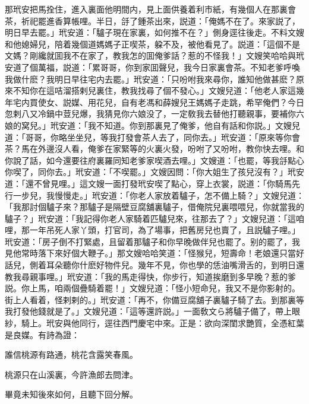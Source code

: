 那玳安把馬拴住，進入裏面他明間内，見上面供養着利市紙，有幾個人在那裏會茶，祈祀罷進香算帳哩。半日，㧱了鍾茶出來，説道：「俺媽不在了。來家説了，明日早去罷。」玳安道：「驢子現在家裏，如何推不在？」側身逕往後走。不料文嫂和他媳婦兒，陪着幾個道媽媽子正喫茶，躱不及，被他看見了。説道：「這個不是文媽？剛纔就囬我不在家了，教我怎的囬俺爹話？惹的不怪我！」文嫂笑哈哈與玳安道了個萬福，説道：「累哥哥，你到家囬聲兒，我今日家裏會茶。不知老爹呼喚我做什麽？我明日早往宅内去罷。」玳安道：「只吩咐我來尋你，誰知他做甚麽？原來不知你在這咭溜搭剌兒裏住，教我找尋了個不發心。」文嫂兒道：「他老人家這幾年宅内買使女、説媒、用花兒，自有老馮和薛嫂兒王媽媽子走跳，希罕俺們？今日忽剌八又冷鍋中荳兒爆，我猜見你六娘没了，一定敎我去替他打聽親事，要補你六娘的窝兒。」玳安道：「我不知道。你到那裏見了俺爹，他自有話和你説。」文嫂兒道：「哥哥，你略坐坐兒，等我打發會茶人去了，同你去。」玳安道：「原來等你會茶？馬在外邊沒人看，俺爹在家緊等的火裏火發，吩咐了又吩咐，教你快去哩。和你說了話，如今還要往府裏羅同知老爹家喫酒去哩。」文嫂道：「也罷，等我㧱點心你喫了，同你去。」玳安道：「不喫罷。」文嫂因問：「你大姐生了孩兒沒有？」玳安道：「還不曾見哩。」這文嫂一面打發玳安喫了點心，穿上衣裳，説道：「你騎馬先行一步兒，我慢慢走。」玳安道：「你老人家放着驢子，怎不備上騎？」文嫂兒道：「我那討個驢子來？那驢子是隔壁豆腐舖裏驢子，借俺院兒裏喂喂兒，你就當我的驢子？」玳安道：「我記得你老人家騎着匹驢兒來，往那去了？」文嫂兒道：「這咱哩，那一年吊死人家丫頭，打官司，為了場事，把舊房兒也賣了，且説驢子哩。」玳安道：「房子倒不打緊處，且留着那驢子和你早晚做伴兒也罷了。别的罷了，我見他常時落下來好個大鞭子。」那文嫂哈哈笑道：「怪猴兒，短壽命！老娘還只當好話兒，側着耳朵聽你什麽好物件兒。幾年不見，你也學的恁油嘴滑舌的，到明日還教我尋親事哩。」玳安道：「我的馬走得快，你步行，知道挨磨到多早晚？惹的爹説。你上馬，咱兩個疊騎着罷！」文嫂兒道：「怪小短命兒，我又不是你影射的。街上人看着，怪剌剌的。」玳安道：「再不，你備豆腐舖子裏驢子騎了去。到那裏等我打發他錢就是了。」文嫂兒道：「這等還許説。」一面敎文ら將驢子備了，帶上眼紗，騎上。玳安與他同行，逕往西門慶宅中來。正是：欲向深閨求艷質，全憑紅葉是良媒。有詩為證：

\begin{myquote}
誰信桃源有路通，桃花含露笑春風。

桃源只在山溪裏，今許漁郎去問津。
\end{myquote}

畢竟未知後來如何，且聽下回分解。


